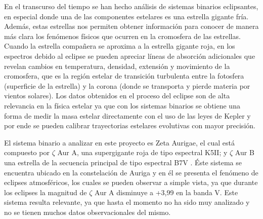 \documentclass[11pt]{article}
\begin{document}
\noindent En el transcurso del tiempo se han hecho análisis de sistemas binarios eclipsantes, en especial donde una de las componentes estelares es una estrella gigante fría. Además, estas estrellas nos permiten obtener información para conocer de manera más clara los fenómenos físicos que ocurren en la cromosfera de las estrellas. Cuando la estrella compañera se aproxima a la estrella gigante roja, en los espectros debido al eclipse se pueden apreciar líneas de absorción adicionales que revelan cambios en temperatura, densidad, extensión y movimiento de la cromosfera, que es la región estelar de transición turbulenta entre la fotosfera (superficie de la estrella) y la corona (donde se transporta y pierde materia por vientos solares). Los datos obtenidos en el proceso del eclipse son de alta relevancia en la física estelar ya que con los sistemas binarios se obtiene una forma de medir la masa estelar directamente con el uso de las leyes de Kepler y por ende se pueden calibrar trayectorias estelares evolutivas con mayor precisión. 

\noindent El sistema binario a analizar en este proyecto es Zeta Aurigae, el cual está compuesto por $\zeta$ Aur A, una supergigante roja de tipo espectral K5II; y $\zeta$ Aur B una estrella de la secuencia principal de tipo espectral B7V \cite{shenavrin2011vizier}. Éste sistema se encuentra ubicado en la constelación de Auriga  y en él se presenta el fenómeno de eclipses atmosféricos, los cuales se pueden observar a simple vista, ya que durante los eclipses la magnitud de $\zeta$ Aur A disminuye a +3,99 en la banda V. Este sistema resulta relevante, ya que hasta el momento no ha sido muy analizado y no se tienen muchos datos observacionales del mismo.
\vspace{2mm}
\end{document}
